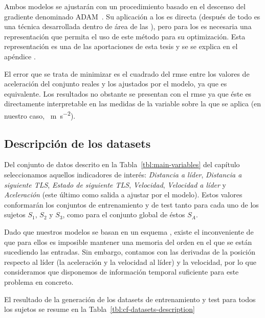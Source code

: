Ambos modelos se ajustarán con un procedimiento basado en el descenso del gradiente denominado ADAM~\cite{kingma2014adam}. Su aplicación a los  es directa (después de todo es una técnica desarrollada dentro de área de las ), pero para los  es necesaria una representación que permita el uso de este método para su optimización. Esta representación es una de las aportaciones de esta tesis y se se explica en el apéndice .

El error que se trata de minimizar es el cuadrado del \gls{rmse} entre los valores de aceleración del conjunto reales y los ajustados por el modelo, ya que es equivalente. Los resultados no obstante se presentan con el \gls{rmse} ya que éste es directamente interpretable en las medidas de la variable sobre la que se aplica (en nuestro caso, \SI{}{\metre\per\square\second}).

\subsection{Descripción de los datasets}

Del conjunto de datos descrito en la Tabla~\ref{tbl:main-variables} del capítulo~ seleccionamos aquellos indicadores de interés: \textit{Distancia a líder}, \textit{Distancia a siguiente TLS}, \textit{Estado de siguiente TLS}, \textit{Velocidad}, \textit{Velocidad a líder} y \textit{Aceleración} (este último como salida a ajustar por el modelo). Estos valores conformarán los conjuntos de entrenamiento y de test tanto para cada uno de los sujetos $S_1$, $S_2$ y $S_3$, como para el conjunto global de éstos $S_A$.

Dado que nuestros modelos se basan en un esquema \textit{}, existe el inconveniente de que para ellos es imposible mantener una memoria del orden en el que se están sucediendo las entradas. Sin embargo, contamos con las derivadas de la posición respecto al líder (la aceleración y la velocidad al líder) y la velocidad, por lo que consideramos que disponemos de información temporal suficiente para este problema en concreto.

El resultado de la generación de los datasets de entrenamiento y test para todos los sujetos se resume en la Tabla~\ref{tbl:cf-datasets-description}

